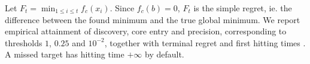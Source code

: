 Let \(F_t=\min_{1\leq i\leq t}f_c(x_i)\). Since \(f_c(b)=0\), \(F_t\) is the simple regret, ie. the difference between the found minimum and the true global minimum. We report empirical attainment of discovery, core entry and precision, corresponding to thresholds \(1\), \(0.25\) and \(10^{-2}\), together with terminal regret and first hitting times \cite{coco}. A missed target has hitting time \(+\infty\) by default. 





